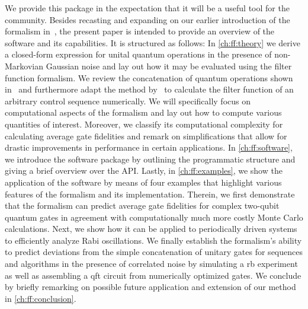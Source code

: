 We provide this package in the expectation that it will be a useful tool for the community.
Besides recasting and expanding on our earlier introduction of the formalism in~, the present paper is intended to provide an overview of the software and its capabilities.
It is structured as follows: In \cref{ch:ff:theory} we derive a closed-form expression for unital quantum operations in the presence of non-Markovian Gaussian noise and lay out how it may be evaluated using the filter function formalism.
We review the concatenation of quantum operations shown in~ and furthermore adapt the method by~\citet{Green2013} to calculate the filter function of an arbitrary control sequence numerically.
We will specifically focus on computational aspects of the formalism and lay out how to compute various quantities of interest.
Moreover, we classify its computational complexity for calculating average gate fidelities and remark on simplifications that allow for drastic improvements in performance in certain applications.
In \cref{ch:ff:software}, we introduce the software package by outlining the programmatic structure and giving a brief overview over the API.
Lastly, in \cref{ch:ff:examples}, we show the application of the software by means of four examples that highlight various features of the formalism and its implementation.
Therein, we first demonstrate that the formalism can predict average gate fidelities for complex two-qubit quantum gates in agreement with computationally much more costly Monte Carlo calculations.
Next, we show how it can be applied to periodically driven systems to efficiently analyze Rabi oscillations.
We finally establish the formalism's ability to predict deviations from the simple concatenation of unitary gates for sequences and algorithms in the presence of correlated noise by simulating a \gls{rb} experiment as well as assembling a \gls{qft} circuit from numerically optimized gates.
We conclude by briefly remarking on possible future application and extension of our method in \cref{ch:ff:conclusion}.

